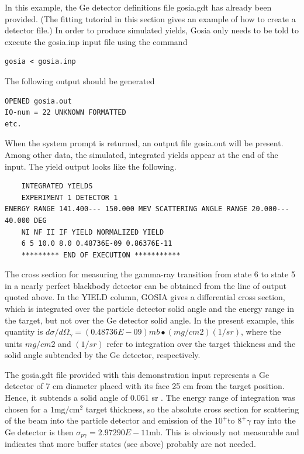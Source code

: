 \documentclass[10pt]{article}
\begin{document}
In this example, the Ge detector definitions file gosia.gdt has already been provided. (The fitting tutorial in this section gives an example of how to create a detector file.) In order to produce simulated yields, Gosia only needs to be told to execute the gosia.inp input file using the command

\begin{verbatim}
gosia < gosia.inp
\end{verbatim}

The following output should be generated

\begin{verbatim}
OPENED gosia.out
IO-num = 22 UNKNOWN FORMATTED
etc.
\end{verbatim}

When the system prompt is returned, an output file gosia.out will be present. Among other data, the simulated, integrated yields appear at the end of the input. The yield output looks like the following.

\begin{verbatim}
    INTEGRATED YIELDS
    EXPERIMENT 1 DETECTOR 1
ENERGY RANGE 141.400--- 150.000 MEV SCATTERING ANGLE RANGE 20.000--- 40.000 DEG
    NI NF II IF YIELD NORMALIZED YIELD
    6 5 10.0 8.0 0.48736E-09 0.86376E-11
    ********* END OF EXECUTION ***********
\end{verbatim}

The cross section for measuring the gamma-ray transition from state 6 to state 5 in a nearly perfect blackbody detector can be obtained from the line of output quoted above. In the YIELD column, GOSIA gives a differential cross section, which is integrated over the particle detector solid angle and the energy range in the target, but not over the Ge detector solid angle. In the present example, this quantity is $d \sigma / d \Omega_{\gamma}=(0.48736 E-09) m b \bullet(m g / c m 2)(1 / s r)$, where the units $m g / c m 2$ and $(1 / s r)$ refer to integration over the target thickness and the solid angle subtended by the Ge detector, respectively.

The gosia.gdt file provided with this demonstration input represents a Ge detector of 7 cm diameter placed with its face 25 cm from the target position. Hence, it subtends a solid angle of 0.061 sr . The energy range of integration was chosen for a $1 \mathrm{mg} / \mathrm{cm}^{2}$ target thickness, so the absolute cross section for scattering of the beam into the particle detector and emission of the $10^{+}$to $8^{+} \gamma$ ray into the Ge detector is then $\sigma_{p \gamma}=2.97290 E-11 \mathrm{mb}$. This is obviously not measurable and indicates that more buffer states (see above) probably are not needed.
\end{document}
